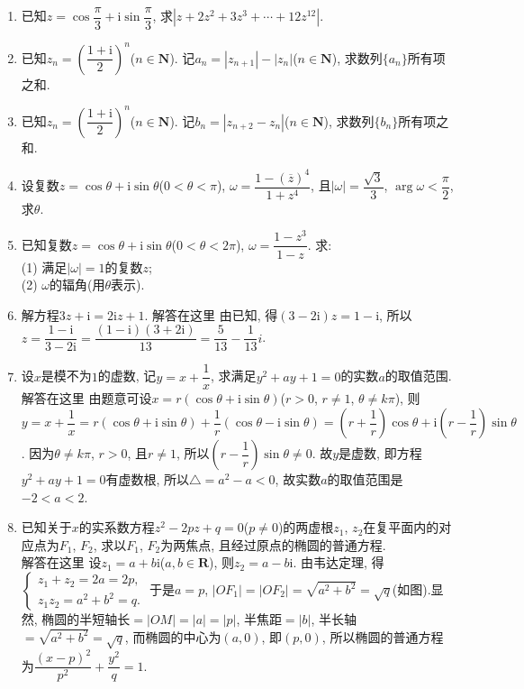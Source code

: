\documentclass[10pt,a4paper]{article}
\begin{document}
\begin{enumerate}[1.]
\item 已知$z=\cos \dfrac{\pi }3+\mathrm{i}\sin \dfrac{\pi }3$, 求$|z+2z^2+3z^3+\cdots +12z^{12}|$.
\item 已知$z_n=(\dfrac{1+\mathrm{i}}2)^n$($n\in \mathbf{N}$). 记$a_n=|z_{n+1}|-|z_n|$($n\in \mathbf{N}$), 求数列$\{a_n\}$所有项之和.
\item 已知$z_n=(\dfrac{1+\mathrm{i}}2)^n$($n\in \mathbf{N}$). 记$b_n=|z_{n+2}-z_n|$($n\in \mathbf{N}$), 求数列$\{b_n\}$所有项之和.
\item 设复数$z=\cos \theta +\mathrm{i}\sin \theta$($0<\theta <\pi$), $\omega =\dfrac{1-{{({\overline z})}^4}}{1+{z^4}}$, 且$|\omega|=\dfrac{\sqrt 3}3$, $\arg \omega <\dfrac{\pi }2$, 求$\theta$.
\item 已知复数$z=\cos \theta +\mathrm{i}\sin \theta$($0<\theta <2\pi$), $\omega =\dfrac{1-{z^3}}{1-z}$. 求:\\
(1) 满足$|\omega|=1$的复数$z$;\\
(2) $\omega$的辐角(用$\theta$表示).
\item 解方程$3z+\mathrm{i}=2\mathrm{i}z+1$.
解答在这里  由已知, 得$(3-2\mathrm{i})z=1-\mathrm{i}$, 所以$z=\dfrac{1-\mathrm{i}}{3-2\mathrm{i}}=\dfrac{(1-\mathrm{i})(3+2\mathrm{i})}{13}=\dfrac 5{13}-\dfrac 1{13}i$.
\item 设$x$是模不为$1$的虚数, 记$y=x+\dfrac 1x$, 求满足$y^2+ay+1=0$的实数$a$的取值范围.
解答在这里  由题意可设$x=r(\cos \theta +\mathrm{i}\sin \theta)$($r>0$, $r\ne 1$, $\theta \ne k\pi$),
则$y=x+\dfrac 1x=r(\cos \theta +\mathrm{i}\sin \theta)+\dfrac 1r(\cos \theta -\mathrm{i}\sin \theta)=(r+\dfrac 1r)\cos \theta +\mathrm{i}(r-\dfrac 1r)\sin \theta$.
因为$\theta \ne k\pi$, $r>0$, 且$r\ne 1$, 所以$(r-\dfrac 1r)\sin \theta \ne 0$.
故$y$是虚数, 即方程$y^2+ay+1=0$有虚数根, 所以$\triangle =a^2-a<0$,
故实数$a$的取值范围是$-2<a<2$.
\item 已知关于$x$的实系数方程$z^2-2pz+q=0$($p\ne 0$)的两虚根$z_1$, $z_2$在复平面内的对应点为$F_1$, $F_2$, 求以$F_1$, $F_2$为两焦点, 且经过原点的椭圆的普通方程.\\
解答在这里  设$z_1=a+b\mathrm{i}$($a,b\in \mathbf{R}$), 则$z_2=a-b\mathrm{i}$.
由韦达定理, 得$\begin{cases} z_1+z_2=2a=2p, \\ z_1z_2=a^2+b^2=q. \end{cases}$
于是$a=p$, $|OF_1|=|OF_2|=\sqrt {a^2+b^2}=\sqrt q$(如图).显然, 椭圆的半短轴长$=|OM|=|a|=|p|$, 半焦距$=|b|$, 半长轴$=\sqrt {a^2+b^2}=\sqrt q$, 而椭圆的中心为$(a,0)$, 即$(p,0)$, 所以椭圆的普通方程为$\dfrac{{{(x-p)}^2}}{p^2}+\dfrac{y^2}q=1$.
\begin{center}

\end{center}
\end{enumerate}
\end{document}

